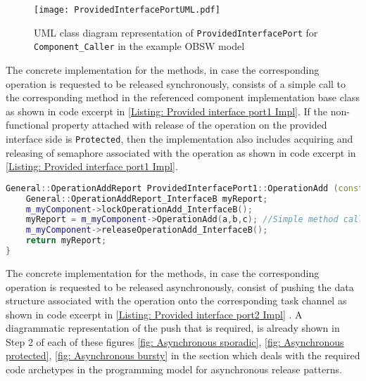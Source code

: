 \begin{figure}[h]
	\centering
	\texttt{[image: ProvidedInterfacePortUML.pdf]}
	\caption{UML class diagram representation of \texttt{Provided\allowbreak Interface\allowbreak Port} for \texttt{Component\allowbreak\_Caller} in the example OBSW model}
	\label{fig: Provided interface port UML}
\end{figure}   

The concrete implementation for the methods, in case the corresponding operation is requested to be released synchronously, consists of a simple call to the corresponding method in the referenced component implementation base class as shown in code excerpt in \cref{Listing: Provided interface port1 Impl}. If the non-functional property attached with release of the operation on the provided interface side is \texttt{Protected}, then the implementation also includes acquiring and releasing of semaphore associated with the operation as shown in code excerpt in \cref{Listing: Provided interface port1 Impl}. 

\begin{Listing}
\begin{lstlisting}[language=C++]
General::OperationAddReport ProvidedInterfacePort1::OperationAdd (const IntegerType& a,const IntegerType& b,IntegerType& c) {
	General::OperationAddReport_InterfaceB myReport;
	m_myComponent->lockOperationAdd_InterfaceB();
	myReport = m_myComponent->OperationAdd(a,b,c); //Simple method call
	m_myComponent->releaseOperationAdd_InterfaceB();
	return myReport;
}
\end{lstlisting}
\caption{Code excerpt from the generated code for operation \texttt{OperationAdd} access in \texttt{Provided\allowbreak Interface\allowbreak Port1} which is called synchronously and has \texttt{Protected} as a non-functional property attached to it}
\label{Listing: Provided interface port1 Impl}
\end{Listing}

The concrete implementation for the methods, in case the corresponding operation is requested to be released asynchronously, consist of pushing the data structure associated with the operation onto the corresponding task channel as shown in code excerpt in \cref{Listing: Provided interface port2 Impl} . A diagrammatic representation of the push that is required, is already shown in Step 2 of each of these figures \cref{fig: Asynchronous sporadic}, \cref{fig: Asynchronous protected}, \cref{fig: Asynchronous bursty} in the section which deals with the required code archetypes in the programming model for asynchronous release patterns.

